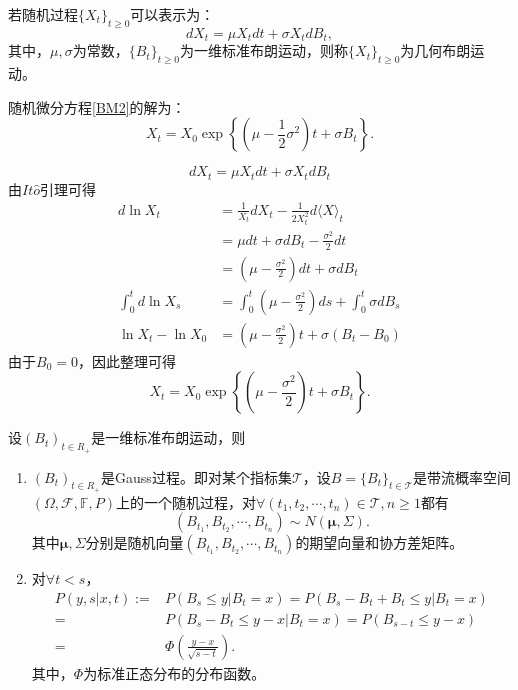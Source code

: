 \begin{Definition}[几何布朗运动]
	若随机过程$\{X_t\}_{t\ge0}$可以表示为：
	\begin{equation}
		\label{BM2}
		dX_t = \mu X_t dt+\sigma X_t  dB_t,
	\end{equation}
	其中，$\mu,\sigma$为常数，$\{B_t\}_{t \ge 0 }$为一维标准布朗运动，则称$\{X_t\}_{t\ge0}$为几何布朗运动。
\end{Definition}
随机微分方程\ref{BM2}的解为：
$$X_t = X_0\exp\left\{\left(\mu-\frac{1}{2}\sigma^2\right)t+\sigma B_t\right\}.$$
\begin{Proof}
	$$dX_t = \mu X_t dt+\sigma X_t  dB_t$$
	由$It\hat{o}$引理可得
	\begin{align}
		d\ln X_t &= \frac{1}{X_t}dX_t - \frac{1}{2X_t^2}d\langle X \rangle_t \nonumber\\
		& = \mu dt +\sigma dB_t -\frac{\sigma^2}{2} dt \nonumber \\ 
		& = \left(\mu - \frac{\sigma^2}{2} \right) dt + \sigma dB_t \nonumber\\
		\int_0^t d\ln X_s &= \int_0^t \left(\mu - \frac{\sigma^2}{2} \right) ds +\int_0^t \sigma dB_s \nonumber\\
		\ln X_t - \ln X_0 & = \left(\mu - \frac{\sigma^2}{2} \right)t + \sigma (B_t-B_0) \nonumber 
	\end{align}
	由于$B_0 = 0$，因此整理可得
	$$X_t  = X_0 \exp\left\{ \left(\mu - \frac{\sigma^2}{2} \right)t + \sigma B_t\right\}.$$
\end{Proof}
\begin{Theorem}[布朗运动的基本性质]
	设$(B_t)_{t\in R_+}$是一维标准布朗运动，则
	\begin{enumerate}[fullwidth,itemindent=2em] %
		\item $(B_t)_{t\in R_+}$是Gauss过程。即对某个指标集$\mathcal{T}$，设$B=\{B_t\}_{t\in\mathcal{T}}$是带流概率空间$(\Omega,\mathcal{F},\mathbb{F},P)$上的一个随机过程，对$\forall (t_1,t_2,\cdots,t_n)\in \mathcal{T},n\ge 1$都有
		$$\left(B_{t_1},B_{t_2},\cdots,B_{t_n}\right)\sim N(\bm{\mu},\Sigma).$$
		其中$\bm{\mu},\Sigma$分别是随机向量$\left(B_{t_1},B_{t_2},\cdots,B_{t_n}\right)$的期望向量和协方差矩阵。
		
		\item 对$\forall t<s$，
		\begin{align}
			P(y,s|x,t):=& P(B_s\le y|B_t = x) = P\left(B_s-B_t+B_t\le y|B_t = x\right)\nonumber\\
			= & P\left(B_s-B_t\le y-x|B_t = x\right)  =  P\left(B_{s-t}\le y-x\right) \nonumber \\
			= & \Phi\left(\frac{y-x}{\sqrt{s-t}}\right). \nonumber 
		\end{align}
		其中，$\Phi$为标准正态分布的分布函数。
	\end{enumerate}
\end{Theorem}

